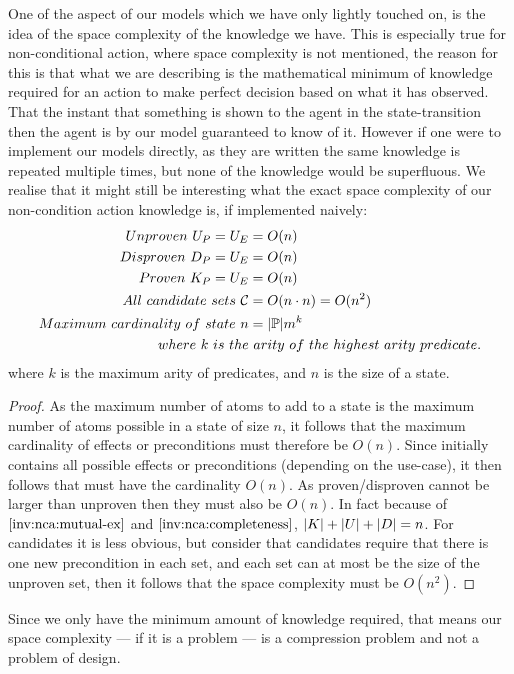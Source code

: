 \documentclass[../Master.tex]{subfiles}
\begin{document}
One of the aspect of our models which we have only lightly touched on, is the idea of the space complexity of the knowledge we have.
This is especially true for non-conditional action, where space complexity is not mentioned, 
the reason for this is that what we are describing is the mathematical minimum of knowledge required for an action to make perfect decision based on what it has observed.
That the instant that something is shown to the agent in the state-transition then the agent is by our model guaranteed to know of it.
However if one were to implement our models directly, as they are written the same knowledge is repeated multiple times, but none of the knowledge would be superfluous.
We realise that it might still be interesting what the exact space complexity of our non-condition action knowledge is, if implemented naively:
 \begin{align*}
 	Unproven ~U_P = U_E & = O(n) \\
 	Disproven~D_P = U_E & = O(n) \\
 	Proven~K_P = U_E &= O(n) \\
 	All ~ candidate~sets~ \mathcal{C} & = O(n \cdot n)=O(n^2) \\
 	Maximum ~ cardinality~ of ~ state  ~ n & = |\mathbb{P}| m^k \\
 	where ~ k ~ is ~ the&  ~ arity ~ of ~ the~ highest~ arity ~ predicate.
 \end{align*} 
 where $k$ is the maximum arity of predicates, and $n$ is the size of a state.
 \begin{proof} 
 	As the maximum number of atoms to add to a state is the maximum number of atoms possible in a state of size $n$,
 	it follows that the maximum cardinality of effects or preconditions must therefore be $O(n)$.
Since \up initially contains all possible effects or preconditions (depending on the use-case), 
	it then follows that \Up must have the cardinality $O(n)$. 
	As proven/disproven cannot be larger than unproven then they must also be $O(n)$.
	In fact because of $\Cref{inv:nca:mutual-ex}$ and $\Cref{inv:nca:completeness}$, $|K|+|U|+|D| = n$.
	For candidates it is less obvious, but consider that candidates require that there is one new precondition in
	each set, and each set can at most be the size of the unproven set, then it follows that the space complexity must be $O(n^2)$.
 \end{proof}
Since we only have the minimum amount of knowledge required, that means our space complexity --- if it is a problem --- is a compression problem and not a problem of design. 
\end{document}
